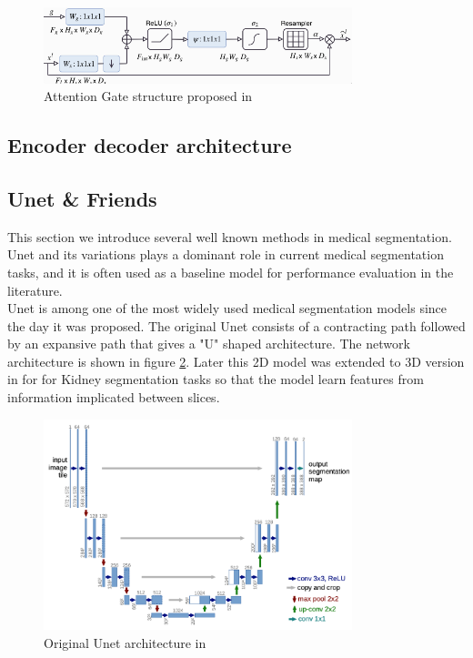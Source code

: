 \begin{figure}
\centering
\includegraphics[width = 0.8\textwidth]{img/background_img/attention_gate}
\caption{Attention Gate structure proposed in \cite{}}
\label{fig:att_gate}
\end{figure}


\subsection{Encoder decoder architecture}



\subsection{Unet \& Friends}
This section we introduce several well known methods in medical segmentation. Unet \cite{ronneberger_u-net_2015} and its variations plays a dominant role in current medical segmentation tasks, and it is often used as a baseline model for performance evaluation in the literature.\\

Unet \cite{ronneberger_u-net_2015} is among one of the most widely used medical segmentation models since the day it was proposed. The original Unet consists of a contracting path followed by an expansive path that gives a "U" shaped architecture. The network architecture is shown in figure \ref{fig:unet-arch}.
Later this 2D model was extended to 3D version in \cite{ourselin_3d_2016} for for Kidney segmentation tasks so that the model learn features from information implicated between slices.\\
\begin{figure}
\centering
\includegraphics[width = 0.8\textwidth]{img/Unet_architecture}
\caption{Original Unet architecture in \cite{ronneberger_u-net_2015}}
\label{fig:unet-arch}
\end{figure}

